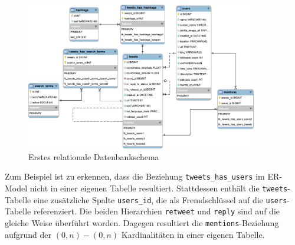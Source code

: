 \begin{figure}[!ht]
\centering
\includegraphics[width=0.9\textwidth]{Bilder/Datenbank/SchemaErsteIteration.pdf}
\caption{Erstes relationale Datenbankschema}
\label{img:schemadb1}
\end{figure}

Zum Beispiel ist zu erkennen, dass die Beziehung \texttt{tweets\_has\_users} im ER-Model nicht in einer eigenen Tabelle resultiert.
Stattdessen enthält die \texttt{tweets}-Tabelle eine zusätzliche Spalte \texttt{users\_id}, die als Fremdschlüssel auf die \texttt{users}-Tabelle referenziert.
Die beiden Hierarchien \texttt{retweet} und \texttt{reply} sind auf die gleiche Weise überführt worden.
Dagegen resultiert die \texttt{mentions}-Beziehung aufgrund der $(0,n)-(0,n)$ Kardinalitäten in einer eigenen Tabelle. 

